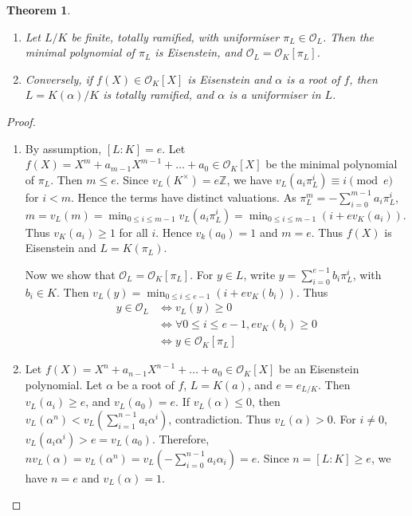 \documentclass[11pt]{article}
\theoremstyle{definition}
\theoremstyle{plain}
\newtheorem{theorem}[definition]{Theorem}
\theoremstyle{remark}
\newcommand{\ZZ}{\mathbb{Z}}
\newcommand{\cO}{\mathcal{O}}
\begin{document}
\begin{theorem}\label{thm:13_8}\phantom{}
    \begin{enumerate}
        \item Let $L/K$ be finite, totally ramified, with uniformiser $\pi_L \in \cO_L$. Then the minimal polynomial of $\pi_L$ is Eisenstein, and $\cO_L = \cO_K[\pi_L]$.
        \item Conversely, if $f(X) \in \cO_K[X]$ is Eisenstein and $\alpha$ is a root of $f$, then $L = K(\alpha) / K$ is totally ramified, and $\alpha$ is a uniformiser in $L$.
    \end{enumerate}
\end{theorem}
\begin{proof}\phantom{}
    \begin{enumerate}
        \item By assumption, $[L : K] = e$. Let $f(X) = X^m + a_{m-1} X^{m-1} + \ldots + a_0 \in \cO_K[X]$ be the minimal polynomial of $\pi_L$. Then $m \le e$. Since $v_L(K^\times) = e \ZZ$, we have $v_L(a_i \pi_L^i) \equiv i \pmod{e}$ for $i < m$. Hence the terms have distinct valuations. As $\pi_L^m = -\sum_{i=0}^{m-1} a_i \pi_L^i$, $m = v_L(m) = \min_{0 \le i \le m-1} v_L(a_i \pi_L^i) = \min_{0 \le i \le m-1} (i + e v_K(a_i))$. Thus $v_K(a_i) \ge 1$ for all $i$. Hence $v_k(a_0) = 1$ and $m = e$. Thus $f(X)$ is Eisenstein and $L = K(\pi_L)$.

            Now we show that $\cO_L = \cO_K[\pi_L]$. For $y \in L$, write $y = \sum_{i=0}^{e-1} b_i \pi_L^i$, with $b_i \in K$. Then $v_L(y) = \min_{0 \le i \le e-1} (i + e v_K(b_i))$. Thus
            \begin{align*}
                y \in \cO_L
                &\iff v_L(y) \ge 0\\
                &\iff \forall 0 \le i \le e-1, e v_K(b_i) \ge 0\\
                &\iff y \in \cO_K[\pi_L]
            \end{align*}

        \item Let $f(X) = X^n + a_{n-1} X^{n-1} + \ldots + a_0 \in \cO_K[X]$ be an Eisenstein polynomial. Let $\alpha$ be a root of $f$, $L = K(a)$, and $e = e_{L/K}$. Then $v_L(a_i) \ge e$, and $v_L(a_0) = e$. If $v_L(\alpha) \le 0$, then $v_L(\alpha^n) < v_L(\sum_{i=1}^{n-1} a_i \alpha^i)$, contradiction. Thus $v_L(\alpha) > 0$. For $i \neq 0$, $v_L(a_i \alpha^i) > e = v_L(a_0)$. Therefore, $n v_L(\alpha) = v_L(\alpha^n) = v_L(-\sum_{i=0}^{n-1} a_i \alpha_i) = e$. Since $n = [L : K] \ge e$, we have $n = e$ and $v_L(\alpha) = 1$.\qedhere
    \end{enumerate}
\end{proof}
\end{document}
